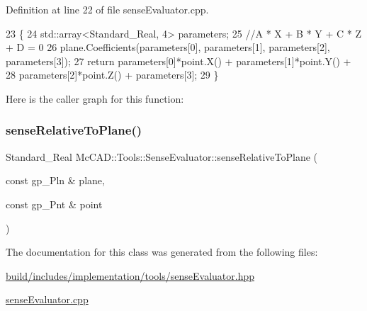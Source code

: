 Definition at line 22 of file sense\+Evaluator.\+cpp.


\begin{DoxyCode}
23                                                                      \{
24     std::array<Standard\_Real, 4> parameters;
25     \textcolor{comment}{//A * X + B * Y + C * Z + D = 0}
26     plane.Coefficients(parameters[0], parameters[1], parameters[2], parameters[3]);
27     \textcolor{keywordflow}{return} parameters[0]*point.X() + parameters[1]*point.Y() +
28            parameters[2]*point.Z() + parameters[3];
29 \}
\end{DoxyCode}
Here is the caller graph for this function\+:
\mbox{\label{classMcCAD_1_1Tools_1_1SenseEvaluator_a1ca5a16c81eae36f9b6fdf4beef7d21e}} 
\subsubsection{\texorpdfstring{sense\+Relative\+To\+Plane()}{senseRelativeToPlane()}\hspace{0.1cm}{\footnotesize\ttfamily [2/2]}}
{\footnotesize\ttfamily Standard\+\_\+\+Real Mc\+C\+A\+D\+::\+Tools\+::\+Sense\+Evaluator\+::sense\+Relative\+To\+Plane (\begin{DoxyParamCaption}\item[{const gp\+\_\+\+Pln \&}]{plane,  }\item[{const gp\+\_\+\+Pnt \&}]{point }\end{DoxyParamCaption})\hspace{0.3cm}{\ttfamily [private]}}



The documentation for this class was generated from the following files\+:\begin{DoxyCompactItemize}
\item 
\hyperlink{build_2includes_2implementation_2tools_2senseEvaluator_8hpp}{build/includes/implementation/tools/sense\+Evaluator.\+hpp}\item 
\hyperlink{senseEvaluator_8cpp}{sense\+Evaluator.\+cpp}\end{DoxyCompactItemize}
